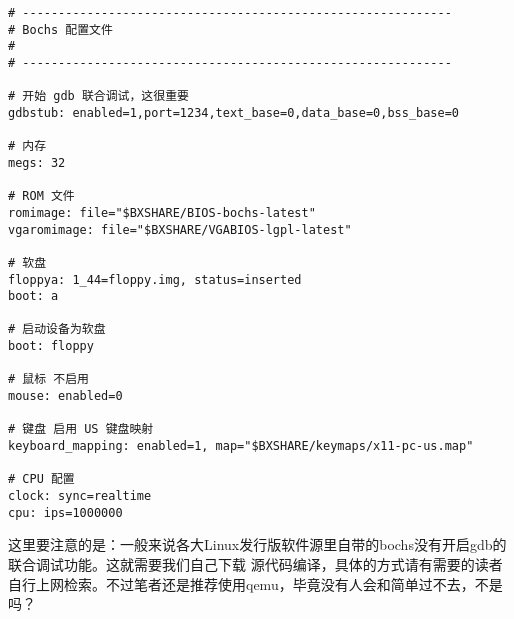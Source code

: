 \begin{lstlisting}
# ------------------------------------------------------------
# Bochs 配置文件
#
# ------------------------------------------------------------

# 开始 gdb 联合调试，这很重要
gdbstub: enabled=1,port=1234,text_base=0,data_base=0,bss_base=0

# 内存
megs: 32

# ROM 文件
romimage: file="$BXSHARE/BIOS-bochs-latest"
vgaromimage: file="$BXSHARE/VGABIOS-lgpl-latest"

# 软盘
floppya: 1_44=floppy.img, status=inserted
boot: a

# 启动设备为软盘
boot: floppy

# 鼠标 不启用
mouse: enabled=0

# 键盘 启用 US 键盘映射
keyboard_mapping: enabled=1, map="$BXSHARE/keymaps/x11-pc-us.map"

# CPU 配置
clock: sync=realtime
cpu: ips=1000000
\end{lstlisting}

\par 这里要注意的是：一般来说各大Linux发行版软件源里自带的bochs没有开启gdb的联合调试功能。这就需要我们自己下载\allowbreak
源代码编译，具体的方式请有需要的读者自行上网检索。不过笔者还是推荐使用qemu，毕竟没有人会和简单过不去，不是吗？

